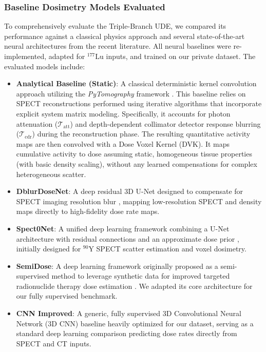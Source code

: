 \documentclass[a4paper,10pt,preprint]{elsarticle}
\begin{document}
\subsubsection{Baseline Dosimetry Models Evaluated}
To comprehensively evaluate the Triple-Branch UDE, we compared its performance against a classical physics approach and several state-of-the-art neural architectures from the recent literature. All neural baselines were re-implemented, adapted for $^{177}\mathrm{Lu}$ inputs, and trained on our private dataset. The evaluated models include:
\begin{itemize}
    \item \textbf{Analytical Baseline (Static)}: A classical deterministic kernel convolution approach utilizing the \textit{PyTomography} framework  \cite{PolsonFedrigo2023}. This baseline relies on SPECT reconstructions performed using iterative algorithms that incorporate explicit system matrix modeling. Specifically, it accounts for photon attenuation ($\mathcal{T}_{\text{att}}$) and depth-dependent collimator detector response blurring ($\mathcal{T}_{\text{cdr}}$) during the reconstruction phase. The resulting quantitative activity maps are then convolved with a Dose Voxel Kernel (DVK). It maps cumulative activity to dose assuming static, homogeneous tissue properties (with basic density scaling), without any learned compensations for complex heterogeneous scatter.
    \item \textbf{DblurDoseNet}: A deep residual 3D U-Net designed to compensate for SPECT imaging resolution blur  \cite{LiFessler2021}, mapping low-resolution SPECT and density maps directly to high-fidelity dose rate maps.
    \item \textbf{Spect0Net}: A unified deep learning framework combining a U-Net architecture with residual connections and an approximate dose prior  \cite{JiaLi2023}, initially designed for $^{90}\mathrm{Y}$ SPECT scatter estimation and voxel dosimetry.
    \item \textbf{SemiDose}: A deep learning framework originally proposed as a semi-supervised method to leverage synthetic data for improved targeted radionuclide therapy dose estimation  \cite{ZhangBousse2025}. We adapted its core architecture for our fully supervised benchmark.
    \item \textbf{CNN Improved}: A generic, fully supervised 3D Convolutional Neural Network (3D CNN) baseline heavily optimized for our dataset, serving as a standard deep learning comparison predicting dose rates directly from SPECT and CT inputs.

\end{itemize}
\end{document}
